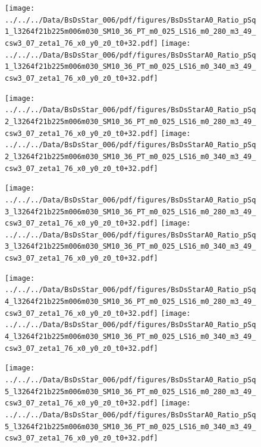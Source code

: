 \documentclass[a4paper,10pt]{article}
\begin{document}
\begin{figure}[p]
 \texttt{[image: ../../../Data/BsDsStar\_006/pdf/figures/BsDsStarA0\_Ratio\_pSq1\_l3264f21b225m006m030\_SM10\_36\_PT\_m0\_025\_LS16\_m0\_280\_m3\_49\_csw3\_07\_zeta1\_76\_x0\_y0\_z0\_t0+32.pdf]} 
 \texttt{[image: ../../../Data/BsDsStar\_006/pdf/figures/BsDsStarA0\_Ratio\_pSq1\_l3264f21b225m006m030\_SM10\_36\_PT\_m0\_025\_LS16\_m0\_340\_m3\_49\_csw3\_07\_zeta1\_76\_x0\_y0\_z0\_t0+32.pdf]} 
 \end{figure}
\begin{figure}[p]
 \texttt{[image: ../../../Data/BsDsStar\_006/pdf/figures/BsDsStarA0\_Ratio\_pSq2\_l3264f21b225m006m030\_SM10\_36\_PT\_m0\_025\_LS16\_m0\_280\_m3\_49\_csw3\_07\_zeta1\_76\_x0\_y0\_z0\_t0+32.pdf]} 
 \texttt{[image: ../../../Data/BsDsStar\_006/pdf/figures/BsDsStarA0\_Ratio\_pSq2\_l3264f21b225m006m030\_SM10\_36\_PT\_m0\_025\_LS16\_m0\_340\_m3\_49\_csw3\_07\_zeta1\_76\_x0\_y0\_z0\_t0+32.pdf]} 
 \end{figure}
\begin{figure}[p]
 \texttt{[image: ../../../Data/BsDsStar\_006/pdf/figures/BsDsStarA0\_Ratio\_pSq3\_l3264f21b225m006m030\_SM10\_36\_PT\_m0\_025\_LS16\_m0\_280\_m3\_49\_csw3\_07\_zeta1\_76\_x0\_y0\_z0\_t0+32.pdf]} 
 \texttt{[image: ../../../Data/BsDsStar\_006/pdf/figures/BsDsStarA0\_Ratio\_pSq3\_l3264f21b225m006m030\_SM10\_36\_PT\_m0\_025\_LS16\_m0\_340\_m3\_49\_csw3\_07\_zeta1\_76\_x0\_y0\_z0\_t0+32.pdf]} 
 \end{figure}
\clearpage
\begin{figure}[p]
 \texttt{[image: ../../../Data/BsDsStar\_006/pdf/figures/BsDsStarA0\_Ratio\_pSq4\_l3264f21b225m006m030\_SM10\_36\_PT\_m0\_025\_LS16\_m0\_280\_m3\_49\_csw3\_07\_zeta1\_76\_x0\_y0\_z0\_t0+32.pdf]} 
 \texttt{[image: ../../../Data/BsDsStar\_006/pdf/figures/BsDsStarA0\_Ratio\_pSq4\_l3264f21b225m006m030\_SM10\_36\_PT\_m0\_025\_LS16\_m0\_340\_m3\_49\_csw3\_07\_zeta1\_76\_x0\_y0\_z0\_t0+32.pdf]} 
 \end{figure}
\begin{figure}[p]
 \texttt{[image: ../../../Data/BsDsStar\_006/pdf/figures/BsDsStarA0\_Ratio\_pSq5\_l3264f21b225m006m030\_SM10\_36\_PT\_m0\_025\_LS16\_m0\_280\_m3\_49\_csw3\_07\_zeta1\_76\_x0\_y0\_z0\_t0+32.pdf]} 
 \texttt{[image: ../../../Data/BsDsStar\_006/pdf/figures/BsDsStarA0\_Ratio\_pSq5\_l3264f21b225m006m030\_SM10\_36\_PT\_m0\_025\_LS16\_m0\_340\_m3\_49\_csw3\_07\_zeta1\_76\_x0\_y0\_z0\_t0+32.pdf]} 
 \end{figure}
\clearpage
\end{document}
